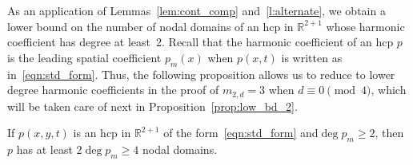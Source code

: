 \documentclass[AHL,Unicode,longabstracts,published]{cedram}
\newcommand{\R}{\mathbb{R}}
\newcommand{\R}{\mathbb{R}}
\begin{document}
As an application of Lemmas~\ref{lem:cont_comp} and~\ref{l:alternate}, we obtain a lower bound on the number of nodal domains of an hcp in $\R^{2+1}$ whose harmonic coefficient has degree at least~2. Recall that the harmonic coefficient of an hcp $p$ is the leading spatial coefficient $p_m(x)$ when $p(x,t)$ is written as in~\eqref{eqn:std_form}. Thus, the following proposition allows us to reduce to lower degree harmonic coefficients in the proof of $m_{2,d} = 3$ when $d \equiv 0 \pmod{4}$, which will be taken care of next in Proposition~\ref{prop:low_bd_2}.

\begin{prop}\label{prop:low_bd}
If $p(x,y,t)$ is an hcp in $\R^{2+1}$ of the form~\eqref{eqn:std_form} and\linebreak ${\deg p_m \ge 2}$, then $p$ has at least $2 \deg p_m \ge 4$ nodal domains.
\end{prop}
\end{document}
